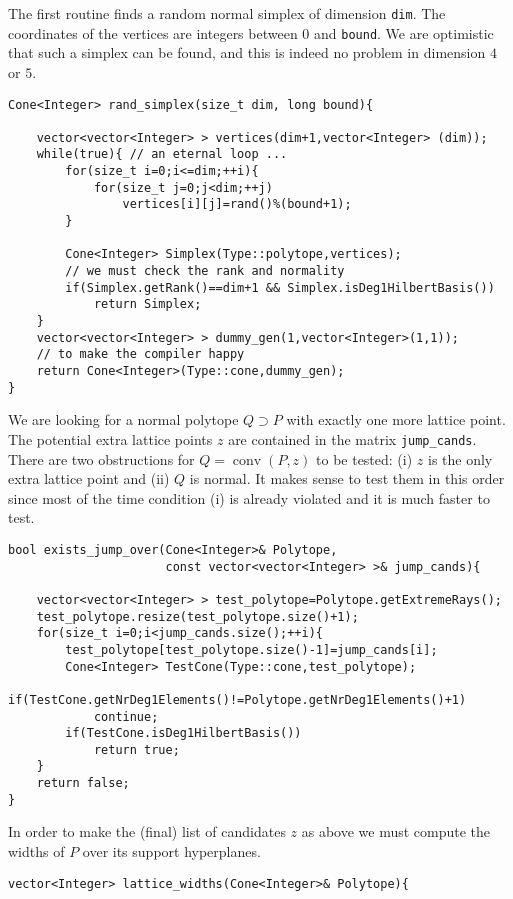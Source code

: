 \documentclass[12pt,a4paper]{scrartcl}
\theoremstyle{definition}
\begin{document}
\begin{small}
The first routine finds a random normal simplex of dimension \verb|dim|. The coordinates of the vertices are integers between $0$ and \verb|bound|. We are optimistic that such a simplex can be found, and this is indeed no problem in dimension $4$ or $5$.

\begin{Verbatim}
Cone<Integer> rand_simplex(size_t dim, long bound){

    vector<vector<Integer> > vertices(dim+1,vector<Integer> (dim));
    while(true){ // an eternal loop ...
        for(size_t i=0;i<=dim;++i){
            for(size_t j=0;j<dim;++j)
                vertices[i][j]=rand()%(bound+1);
        }

        Cone<Integer> Simplex(Type::polytope,vertices);
        // we must check the rank and normality
        if(Simplex.getRank()==dim+1 && Simplex.isDeg1HilbertBasis())
            return Simplex;
    }
    vector<vector<Integer> > dummy_gen(1,vector<Integer>(1,1)); 
    // to make the compiler happy
    return Cone<Integer>(Type::cone,dummy_gen); 
}
\end{Verbatim}

We are looking for a normal polytope $Q\supset P$ with exactly one more lattice point. The potential extra lattice points $z$ are contained in the matrix \verb|jump_cands|. There are two obstructions for $Q=\operatorname{conv}(P,z)$ to be tested: (i) $z$ is the only extra lattice point and (ii) $Q$ is normal. It makes sense to test them in this order since most of the time condition (i) is already violated and it is much faster to test.
\begin{Verbatim}
bool exists_jump_over(Cone<Integer>& Polytope, 
                      const vector<vector<Integer> >& jump_cands){

    vector<vector<Integer> > test_polytope=Polytope.getExtremeRays();
    test_polytope.resize(test_polytope.size()+1); 
    for(size_t i=0;i<jump_cands.size();++i){
        test_polytope[test_polytope.size()-1]=jump_cands[i];
        Cone<Integer> TestCone(Type::cone,test_polytope);
        if(TestCone.getNrDeg1Elements()!=Polytope.getNrDeg1Elements()+1)
            continue;
        if(TestCone.isDeg1HilbertBasis())
            return true;
    }
    return false;
}
\end{Verbatim}

In order to make the (final) list of candidates $z$ as above we must compute the widths of $P$ over its support hyperplanes.
\begin{Verbatim}
vector<Integer> lattice_widths(Cone<Integer>& Polytope){


\end{Verbatim}
\end{small}
\end{document}
